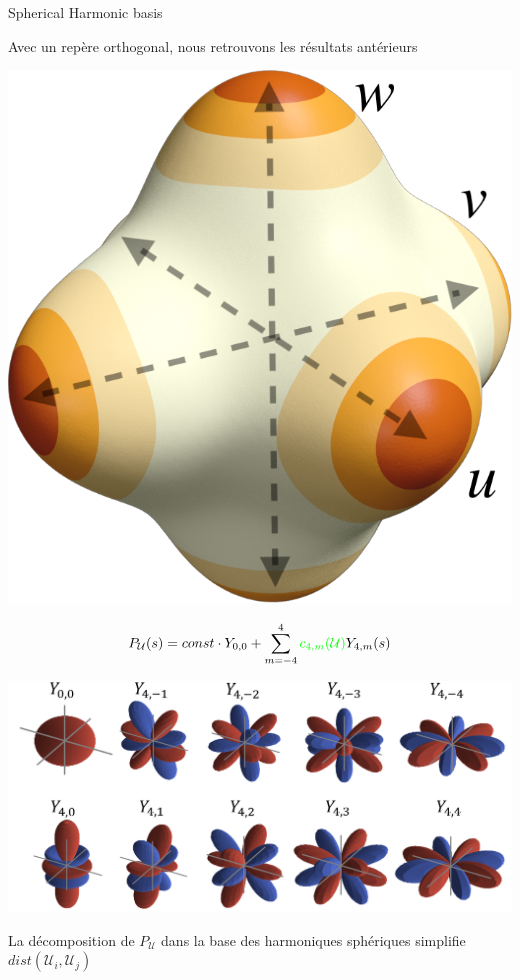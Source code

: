 \begin{frame}{Spherical Harmonic basis}
    \centering
    \begin{overprint}
     \centering
    Avec un repère orthogonal, nous retrouvons les résultats antérieurs\\
    
    \begin{minipage}[c]{0.24\textwidth}
        \centering
          \vspace*{.5\baselineskip}
          \hfill
        \includegraphics[width=0.6\linewidth]{img_spm_ff/sperical_3dir4.png}
    \end{minipage}
    \begin{minipage}[c]{0.74\textwidth}
        $$P_\mathcal{U}(s) = const \cdot Y_{0, 0} + \sum_{m = -4}^4{{\color{green}c_{4, m}(\mathcal{U})}Y_{4,m}(s)}$$ 
    \end{minipage}
    
    \includegraphics[width=.8\linewidth]{img_spm_ff/ortho_harmonic_decompo.PNG} 
    
     \centering
        La décomposition de $P_\mathcal{U}$ dans la base des harmoniques sphériques simplifie $dist(\mathcal{U}_i, \mathcal{U}_j)$ \\
    

\end{overprint}
\end{frame}
